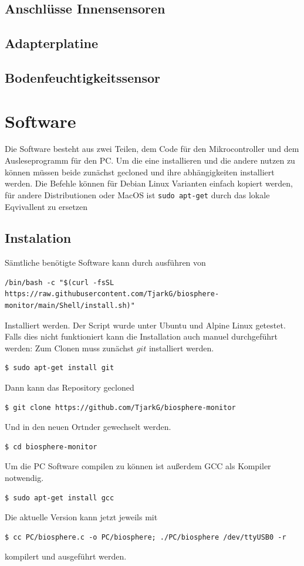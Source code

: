 \documentclass[12pt, a4paper, oneside]{report}
\begin{document}
\section{Anschlüsse Innensensoren}
\label{sec:Innensensoren}

\section{Adapterplatine}
\label{sec:Adapterplatine}

\section{Bodenfeuchtigkeitssensor}
\label{sec:Bodenfeuchtigkeitssensor}

\chapter{Software}
Die Software besteht aus zwei Teilen, dem Code für den Mikrocontroller und dem Ausleseprogramm für den PC. Um die eine installieren und die andere nutzen zu können müssen beide zunächst gecloned und ihre abhängigkeiten installiert werden. Die Befehle können für Debian Linux Varianten einfach kopiert werden, für andere Distributionen oder MacOS ist \lstinline|sudo apt-get| durch das lokale Eqvivallent zu ersetzen
\section{Instalation}
\label{sec:Instalation}
Sämtliche benötigte Software kann durch ausführen von
\begin{lstlisting}
/bin/bash -c "$(curl -fsSL 
https://raw.githubusercontent.com/TjarkG/biosphere-monitor/main/Shell/install.sh)"
\end{lstlisting}
Installiert werden. Der Script wurde unter Ubuntu und Alpine Linux getestet. Falls dies nicht funktioniert kann die Installation auch manuel durchgeführt werden:
Zum Clonen muss zunächst $git$ installiert werden.
\begin{lstlisting}
$ sudo apt-get install git
\end{lstlisting}
Dann kann das Repository gecloned
\begin{lstlisting}
$ git clone https://github.com/TjarkG/biosphere-monitor
\end{lstlisting}
Und in den neuen Ortnder gewechselt werden.
\begin{lstlisting}
$ cd biosphere-monitor
\end{lstlisting}
Um die PC Software compilen zu können ist außerdem GCC als Kompiler notwendig.
\begin{lstlisting}
$ sudo apt-get install gcc
\end{lstlisting}
Die aktuelle Version kann jetzt jeweils mit
\begin{lstlisting}
$ cc PC/biosphere.c -o PC/biosphere; ./PC/biosphere /dev/ttyUSB0 -r
\end{lstlisting}
kompilert und ausgeführt werden. 
\pagebreak
\end{document}
